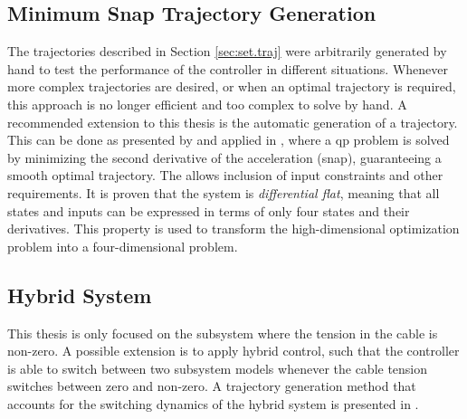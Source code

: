 



\subsection{Minimum Snap Trajectory Generation}
The trajectories described in Section \ref{sec:set.traj} were arbitrarily generated by hand to test the performance of the controller in different situations. 
Whenever more complex trajectories are desired, or when an optimal trajectory is required, this approach is no longer efficient and too complex to solve by hand.
A recommended extension to this thesis is the automatic generation of a trajectory. 
This can be done as presented by \cite{Mellinger2011} and applied in \cite{Tang2014,Tang2015}, where a \acs{qp} problem is solved by minimizing the second derivative of the acceleration (snap),  guaranteeing a smooth optimal trajectory. The  allows inclusion of input constraints and other requirements. 
It is proven that the system is \textit{differential flat}, meaning that all states and inputs can be expressed in terms of only four states and their derivatives. This property is used to transform the high-dimensional optimization problem into a four-dimensional problem.

\subsection{Hybrid System}
This thesis is only focused on the subsystem where the tension in the cable is non-zero. A possible extension is to apply hybrid control, such that the controller is able to switch between two subsystem models whenever the cable tension switches between zero and non-zero. 
A trajectory generation method that accounts for the switching dynamics of the hybrid system is presented in \cite{Tang2014}. 